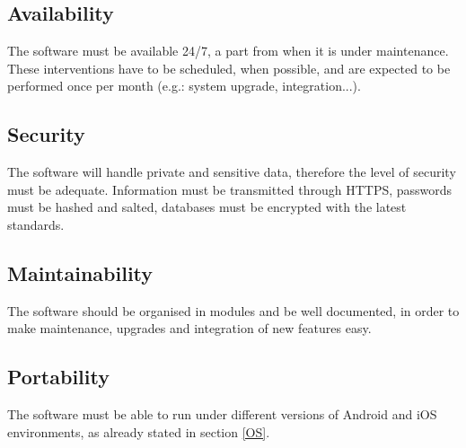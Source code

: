     \subsection{Availability}
        The software must be available 24/7, a part from when it is under maintenance. These interventions have to be scheduled, when possible, and are expected to be performed once per month (e.g.: system upgrade, integration...). 
        
    \subsection{Security}
        The software will handle private and sensitive data, therefore the level of security must be adequate. Information must be transmitted through HTTPS, passwords must be hashed and salted, databases must be encrypted with the latest standards.
    
    \subsection{Maintainability}
        The software should be organised in modules and be well documented, in order to make maintenance, upgrades and integration of new features easy.
    
    \subsection{Portability}
        The software must be able to run under different versions of Android and iOS environments, as already stated in section \ref{OS}.
            